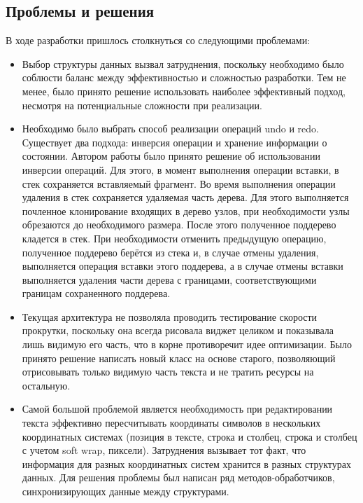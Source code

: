 \documentclass{fefu}
\begin{document}
		\subsection{Проблемы и решения}
			\par В ходе разработки пришлось столкнуться со следующими проблемами:
			\begin{itemize}
				\item Выбор структуры данных вызвал затруднения, поскольку необходимо было
				соблюсти баланс между эффективностью и сложностью разработки. Тем не менее,
				было принято решение использовать наиболее эффективный подход, несмотря на 
				потенциальные сложности при реализации.
				\item Необходимо было выбрать способ реализации операций undo и redo.
				Существует два подхода: инверсия операции и хранение информации о состоянии.
				Автором работы было принято решение об использовании инверсии операций. Для
				этого, в момент выполнения операции вставки, в стек сохраняется
				вставляемый фрагмент. Во время выполнения операции удаления в стек сохраняется
				удаляемая часть дерева. Для этого выполняется почленное клонирование входящих
				в дерево узлов, при необходимости узлы обрезаются до необходимого размера. 
				После этого полученное поддерево кладется в стек. При необходимости отменить
				предыдущую операцию, полученное поддерево берётся из стека и, в случае отмены
				удаления, выполняется операция вставки этого поддерева, а в случае отмены
				вставки выполняется удаления части дерева с границами, соответствующими
				границам сохраненного поддерева.
				\item Текущая архитектура не позволяла проводить тестирование скорости 
				прокрутки, поскольку она всегда рисовала виджет целиком и показывала лишь 
				видимую его часть, что в корне противоречит идее оптимизации. Было принято
				решение написать новый класс на основе старого, позволяющий отрисовывать только
				видимую часть текста и не тратить ресурсы на остальную.
				\item Самой большой проблемой является необходимость при редактировании текста
				эффективно пересчитывать координаты символов в нескольких координатных
				системах (позиция в тексте, строка и столбец, строка и столбец с учетом soft 
				wrap, пиксели). Затруднения вызывает тот факт, что информация для разных
				координатных систем хранится в разных структурах данных. Для решения проблемы
				был написан ряд методов-обработчиков, синхронизирующих данные между 
				структурами.
			\end{itemize}
\end{document}
